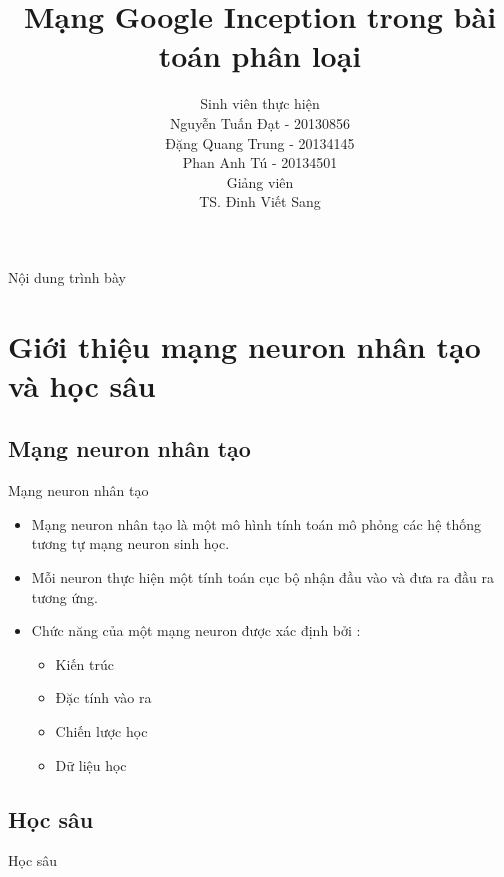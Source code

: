 \documentclass[compress]{beamer}
\title[Mạng Google Inception]{Mạng Google Inception trong bài toán phân loại}
\author[Nguyễn Tuấn Đạt, Đặng Quang Trung, Phan Anh Tú]{
Sinh viên thực hiện\\
Nguyễn Tuấn Đạt - 20130856\\
Đặng Quang Trung - 20134145\\
Phan Anh Tú - 20134501 \\[0.4cm]
Giảng viên \\
TS. Đinh Viết Sang 
}
\begin{document}
 
\begin{frame}
\titlepage
\end{frame} 
  
\begin{frame}{Nội dung trình bày}
\tableofcontents
\end{frame}
\section{Giới thiệu mạng neuron nhân tạo và học sâu}
\subsection{Mạng neuron nhân tạo}
\begin{frame}{Mạng neuron nhân tạo}
\begin{itemize}
\item Mạng neuron nhân tạo là một mô hình tính toán mô phỏng các hệ thống tương tự mạng neuron sinh học.
\item Mỗi neuron thực hiện một tính toán cục bộ nhận đầu vào và đưa ra đầu ra tương ứng.
\item  Chức năng của một  mạng neuron được xác định bởi :
\begin{itemize}
\item Kiến trúc
\item Đặc tính vào ra
\item Chiến lược học
\item Dữ liệu học 
\end{itemize}
\end{itemize}
\end{frame}

\subsection{Học sâu}
\begin{frame}{Học sâu}
\end{frame}
\end{document}
